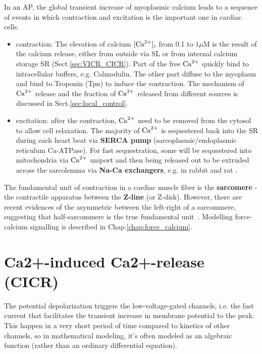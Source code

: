In an AP, the global transient  increase of myoplasmic calcium leads to
a sequence of events in which contraction and excitation is the important one in
cardiac cells.

\begin{itemize}
\item contraction: The elevation of calcium $[{\text{Ca}^{2+}}]_i$ from 0.1 to $1\mu$M is the
result of the calcium release, either
from outside via SL or from internal calcium storage SR (Sect.\ref{sec:VICR_CICR}).
Part of the free ${\text{Ca}^{2+}}$ quickly bind to intracellular buffers, e.g. Calmodulin. 
The other part diffuse to the myoplasm and bind to Troponin (Tpn) to induce the
contraction. The mechanism of ${\text{Ca}^{2+}}$ release and the fraction of ${\text{Ca}^{2+}}$ released
from different sources is discussed in Sect.\ref{sec:local_control}. 

\item excitation: after the contraction, ${\text{Ca}^{2+}}$ need to be removed
  from the cytosol to allow cell relaxation.  The majority of ${\text{Ca}^{2+}}$ is
  sequestered back into the SR during each heart beat via
  {\bf SERCA pump} (sarcoplasmic/endoplasmic reticulum Ca-ATPase). For
  fast sequestration, some will be sequestered into mitochondria
  via ${\text{Ca}^{2+}}$ uniport and then being released out to be
  extruded across the sarcolemma via {\bf Na-Ca exchangers}, e.g. in
  rabbit and rat \citep{bassani1994rir}.
\end{itemize}

The fundamental unit of contraction in a cardiac muscle fiber is the {\bf
sarcomere} - the contractile apparatus between the {\bf Z-line} (or Z-disk).
However, there are recent evidences of the asymmetric between the left-right
of a sarcommere, suggesting that half-sarcommere is the true fundamental
unit~\citep{telley2006}. Modelling force-calcium signalling is described in
Chap.\ref{chap:force_calcium}.


\section{Ca2+-induced Ca2+-release (CICR)}
\label{sec:cicr}

The potential depolarization triggers the low-voltage-gated 
channels, i.e. the fast  current that facilitates the
transient increase in membrane potential to the peak. This happen in a
very short period of time compared to kinetics of other channels, so
in mathematical modeling, it's often modeled as an algebraic function
(rather than an ordinary differential equation).

